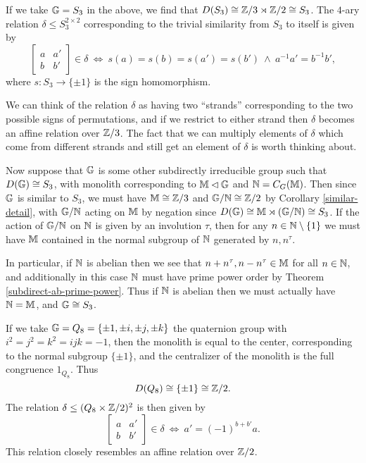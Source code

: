 \documentclass[letterpaper,11pt]{article}
\begin{document}
\begin{ex} If we take $\mathbb{G} = S_3$ in the above, we find that $D(S_3) \cong \mathbb{Z}/3 \rtimes \mathbb{Z}/2 \cong S_3$. The $4$-ary relation $\delta \le S_3^{2\times 2}$ corresponding to the trivial similarity from $S_3$ to itself is given by
\[
\begin{bmatrix} a & a'\\ b & b'\end{bmatrix} \in \delta\ \iff\ s(a) = s(b) = s(a') = s(b')\ \wedge\ a^{-1}a' = b^{-1}b',
\]
where $s : S_3 \rightarrow \{\pm 1\}$ is the sign homomorphism.

We can think of the relation $\delta$ as having two ``strands'' corresponding to the two possible signs of permutations, and if we restrict to either strand then $\delta$ becomes an affine relation over $\mathbb{Z}/3$. The fact that we can multiply elements of $\delta$ which come from different strands and still get an element of $\delta$ is worth thinking about.

Now suppose that $\mathbb{G}$ is some other subdirectly irreducible group such that $D(\mathbb{G}) \cong S_3$, with monolith corresponding to $\mathbb{M} \lhd \mathbb{G}$ and $\mathbb{N} = C_G(\mathbb{M})$. Then since $\mathbb{G}$ is similar to $S_3$, we must have $\mathbb{M} \cong \mathbb{Z}/3$ and $\mathbb{G}/\mathbb{N} \cong \mathbb{Z}/2$ by Corollary \ref{similar-detail}, with $\mathbb{G}/\mathbb{N}$ acting on $\mathbb{M}$ by negation since $D(\mathbb{G}) \cong \mathbb{M} \rtimes (\mathbb{G}/\mathbb{N}) \cong S_3$. If the action of $\mathbb{G}/\mathbb{N}$ on $\mathbb{N}$ is given by an involution $\tau$, then for any $n \in \mathbb{N} \setminus \{1\}$ we must have $\mathbb{M}$ contained in the normal subgroup of $\mathbb{N}$ generated by $n, n^\tau$.

In particular, if $\mathbb{N}$ is abelian then we see that $n + n^\tau, n - n^\tau \in \mathbb{M}$ for all $n \in \mathbb{N}$, and additionally in this case $\mathbb{N}$ must have prime power order by Theorem \ref{subdirect-ab-prime-power}. Thus if $\mathbb{N}$ is abelian then we must actually have $\mathbb{N} = \mathbb{M}$, and $\mathbb{G} \cong S_3$.
\end{ex}

\begin{ex} If we take $\mathbb{G} = Q_8 = \{\pm 1, \pm i, \pm j, \pm k\}$ the quaternion group with $i^2 = j^2 = k^2 = ijk = -1$, then the monolith is equal to the center, corresponding to the normal subgroup $\{\pm 1\}$, and the centralizer of the monolith is the full congruence $1_{Q_8}$. Thus
\[
D(Q_8) \cong \{\pm 1\} \cong \mathbb{Z}/2.
\]
The relation $\delta \le (Q_8 \times \mathbb{Z}/2)^2$ is then given by
\[
\begin{bmatrix} a & a'\\ b & b'\end{bmatrix} \in \delta\ \iff\ a' = (-1)^{b + b'}a.
\]
This relation closely resembles an affine relation over $\mathbb{Z}/2$.
\end{ex}
\end{document}
